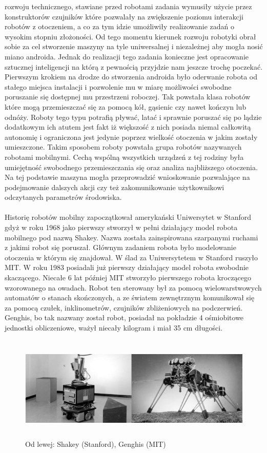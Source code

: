rozwoju technicznego, stawiane przed robotami zadania wymusiły użycie przez
konstruktorów czujników które pozwalały na zwiększenie poziomu interakcji
robotów z otoczeniem, a co za tym idzie umożliwiły realizowanie zadań o wysokim
stopniu złożoności. Od tego momentu kierunek rozwoju robotyki obrał
sobie za cel stworzenie maszyny na tyle uniwersalnej i niezależnej aby mogła
nosić miano androida. Jednak do realizacji tego zadania konieczne jest
opracowanie sztucznej inteligencji na którą z pewnością przyjdzie nam jeszcze
trochę poczekać. \\
\newpage
Pierwszym krokiem na drodze do stworzenia androida było oderwanie robota od
stałego miejsca instalacji i pozwolenie mu w miarę możliwości swobodne
poruszanie się dostępnej mu przestrzeni roboczej. Tak powstała klasa robotów
które mogą przemieszczać się za pomocą kół, gąsienic czy nawet kończyn lub
odnóży. Roboty tego typu potrafią pływać, latać i sprawnie poruszać się
po lądzie dodatkowym ich atutem jest fakt iż większość z nich posiada niemal
całkowitą autonomię i ograniczona jest jedynie poprzez wielkość otoczenia w
jakim zostały umieszczone. Takim sposobem roboty powstała grupa robotów
nazywanych robotami mobilnymi. Cechą wspólną wszystkich urządzeń z tej rodziny
była umiejętność swobodnego przemieszczania się oraz analiza najbliższego
otoczenia. Na tej podstawie maszyna mogła przeprowadzić wnioskowanie pozwalające
na podejmowanie dalszych akcji czy też zakomunikowanie użytkownikowi odczytanych
parametrów środowiska.\\
\\
Historię robotów mobilny zapoczątkował amerykański Uniwersytet w Stanford gdyż
w roku 1968 jako pierwszy stworzył w pełni działający model robota mobilnego pod
nazwą Shakey. Nazwa została zainspirowana szarpanymi ruchami z jakimi robot się
poruszał. Głównym zadaniem robota było modelowanie otoczenia w którym się
znajdował. W ślad za Uniwersytetem w Stanford ruszyło MIT. W roku 1983 posiadali
już pierwszy działający model robota swobodnie skaczącego. Niecałe 6
lat później MIT stworzyło pierwszego robota kroczącego wzorowanego na owadach.
Robot ten sterowany był za pomocą wielowarstwowych automatów o stanach
skończonych, a ze światem zewnętrznym komunikował się za pomocą czułek,
inklinometrów, czujników zbliżeniowych na podczerwień. Genghis, bo tak
nazwany został robot, posiadał na pokładzie 4 ośmiobitowe jednostki obliczeniowe, ważył
niecały kilogram i miał 35 cm długości.

\begin{figure}[hb]
 \centering
 \includegraphics[height=50mm]{../images/ch01/shakey_and_genghis.png}
 \caption{Od lewej: Shakey (Stanford), Genghis (MIT) }
 \label{fig:RobotsHistory_Shakey_Genghis}
\end{figure}

